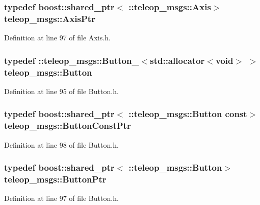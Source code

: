 \subsubsection[{AxisPtr}]{\setlength{\rightskip}{0pt plus 5cm}typedef boost::shared\_\-ptr$<$ ::{\bf teleop\_\-msgs::Axis}$>$ {\bf teleop\_\-msgs::AxisPtr}}\label{namespaceteleop__msgs_a2022ece915372d4d4f14ccc7c38eb153}


Definition at line 97 of file Axis.h.

\subsubsection[{Button}]{\setlength{\rightskip}{0pt plus 5cm}typedef ::{\bf teleop\_\-msgs::Button\_\-}$<$std::allocator$<$void$>$ $>$ {\bf teleop\_\-msgs::Button}}\label{namespaceteleop__msgs_a4bb12e2a52bd630582f31fc93d2e1f79}


Definition at line 95 of file Button.h.

\subsubsection[{ButtonConstPtr}]{\setlength{\rightskip}{0pt plus 5cm}typedef boost::shared\_\-ptr$<$ ::{\bf teleop\_\-msgs::Button} const$>$ {\bf teleop\_\-msgs::ButtonConstPtr}}\label{namespaceteleop__msgs_ad66386077ab40a5e6f8e3cc7b6451422}


Definition at line 98 of file Button.h.

\subsubsection[{ButtonPtr}]{\setlength{\rightskip}{0pt plus 5cm}typedef boost::shared\_\-ptr$<$ ::{\bf teleop\_\-msgs::Button}$>$ {\bf teleop\_\-msgs::ButtonPtr}}\label{namespaceteleop__msgs_a2a647c51488da538a4213440123a13fe}


Definition at line 97 of file Button.h.

